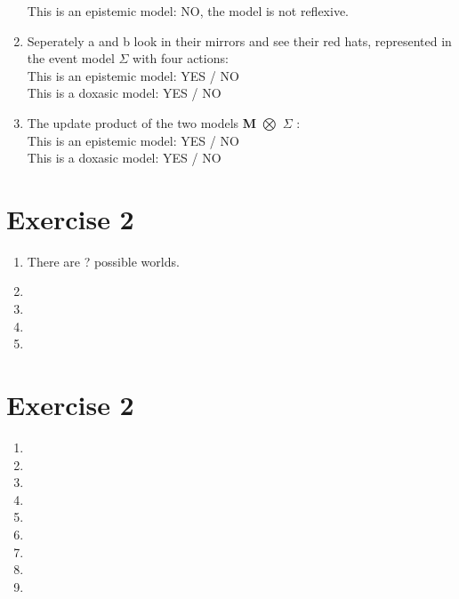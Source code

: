 \documentclass[leqno]{article}
\begin{document}
\begin{enumerate}
    This is an epistemic model: NO, the model is not reflexive. \\

    \item Seperately a and b look in their mirrors and see their red hats, represented in the event model $\Sigma$ with four actions: \\

    This is an epistemic model: YES / NO \\
    This is a doxasic model: YES / NO \\

    \item The update product of the two models \textbf{M} $\bigotimes$ $\Sigma$ : \\

    This is an epistemic model: YES / NO \\
    This is a doxasic model: YES / NO \\

\end{enumerate}


\section{Exercise 2}

\begin{enumerate}

    \item There are ? possible worlds.
    \item
    \item
    \item
    \item

\end{enumerate}


\section{Exercise 2}

\begin{enumerate}

    \item
    \item
    \item
    \item
    \item
    \item
    \item
    \item
    \item

\end{enumerate}
\end{document}
